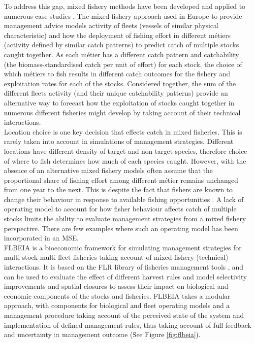 \documentclass[12pt, halfline, a4paper]{ouparticle}
\begin{document}
To address this gap, mixed fishery methods have been developed and applied to
numerous case studies \citep{Ulrich2011, Ulrich2016, Iriondo2012a, Garcia2020}.
The mixed-fishery approach used in Europe to provide management advice
\citep{ICES2019} models activity of fleets (vessels of similar physical
characteristic) and how the deployment of fishing effort in different métiers
(activity defined by similar catch patterns) to predict catch of multiple
stocks caught together. As each métier has a different catch pattern and
catchability (the biomass-standardised catch per unit of effort) for each
stock, the choice of which métiers to fish results in different catch outcomes
for the fishery and exploitation rates for each of the stocks.  Considered
together, the sum of the different fleets activity (and their unique
catchability patterns) provide an alternative way to forecast how the
exploitation of stocks caught together in numerous different fisheries might
develop by taking account of their technical interactions. \\ 

Location choice is one key decision that effects catch in mixed fisheries. This
is rarely taken into account in simulations of management strategies. Different
locations have different density of target and non-target species, therefore
choice of where to fish determines how much of each species caught. However,
with the absence of an alternative mixed fishery models often assume that the
proportional share of fishing effort among different métier remains unchanged
from one year to the next. This is despite the fact that fishers are known to
change their behaviour in response to available fishing opportunities
\citep{VanPutten2012a}. A lack of operating model to account for how fisher
behaviour affects catch of multiple stocks limits the ability to evaluate
management strategies from a mixed fishery perspective. There are few examples
\citep[e.g.][]{Dichmont2008, Fulton2014} where such an operating model has been
incorporated in an MSE. \\

FLBEIA \citep{Garcia2017} is a bioeconomic framework for simulating management
strategies for multi-stock multi-fleet fisheries taking account of
mixed-fishery (technical) interactions. It is based on the FLR library of
fisheries management tools \citep{Kell2007}, and can be used to evaluate the
effect of different harvest rules and model selectivity improvements and
spatial closures to assess their impact on biological and economic components
of the stocks and fisheries. FLBEIA takes a modular approach, with components
for biological and fleet operating models and a management procedure taking
account of the perceived state of the system and implementation of defined
management rules, thus taking account of full feedback and uncertainty in
management outcome (See Figure \ref{fig:flbeia}). \\
\end{document}

